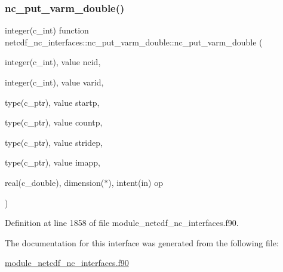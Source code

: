 \subsubsection{\texorpdfstring{nc\+\_\+put\+\_\+varm\+\_\+double()}{nc\_put\_varm\_double()}}
{\footnotesize\ttfamily integer(c\+\_\+int) function netcdf\+\_\+nc\+\_\+interfaces\+::nc\+\_\+put\+\_\+varm\+\_\+double\+::nc\+\_\+put\+\_\+varm\+\_\+double (\begin{DoxyParamCaption}\item[{integer(c\+\_\+int), value}]{ncid,  }\item[{integer(c\+\_\+int), value}]{varid,  }\item[{type(c\+\_\+ptr), value}]{startp,  }\item[{type(c\+\_\+ptr), value}]{countp,  }\item[{type(c\+\_\+ptr), value}]{stridep,  }\item[{type(c\+\_\+ptr), value}]{imapp,  }\item[{real(c\+\_\+double), dimension($\ast$), intent(in)}]{op }\end{DoxyParamCaption})}



Definition at line 1858 of file module\+\_\+netcdf\+\_\+nc\+\_\+interfaces.\+f90.



The documentation for this interface was generated from the following file\+:\begin{DoxyCompactItemize}
\item 
\hyperlink{module__netcdf__nc__interfaces_8f90}{module\+\_\+netcdf\+\_\+nc\+\_\+interfaces.\+f90}\end{DoxyCompactItemize}
